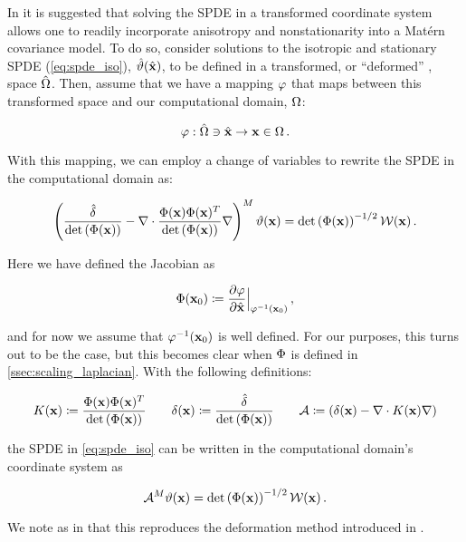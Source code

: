 In \citet{RSSB:RSSB777} it is suggested that solving the SPDE in a transformed
coordinate system allows one to readily incorporate anisotropy and
nonstationarity into a Mat\'ern covariance model.
To do so, consider solutions to the isotropic and stationary SPDE
(\cref{eq:spde_iso}), $\hat{\vartheta}(\hat{\mathbf{x}})$, to be defined in a transformed, or
``deformed'' \citep{sampson_nonparametric_1992}, space $\hat{\Omega}$.
Then, assume that we have a mapping $\varphi$ that maps between this transformed space
and our computational domain, $\Omega$:
\begin{linenomath*}\begin{equation*}
    \varphi : \hat{\Omega}\ni\hat{\mathbf{x}} \rightarrow \mathbf{x}\in\Omega \, .
\end{equation*}\end{linenomath*}
With this mapping, we can employ a change of variables
\citep{smith_change_1934} to rewrite the SPDE in the computational domain as:
\begin{linenomath*}\begin{equation*}
    \left(\dfrac{\hat{\delta}}{\text{det}\left(\Phi(\mathbf{x})\right)} -
    \nabla\cdot
    \dfrac{\Phi(\mathbf{x})\Phi(\mathbf{x})^T}{\text{det}\left(\Phi(\mathbf{x})\right)}
    \nabla\right)^M\vartheta(\mathbf{x}) =
    \text{det}\left(\Phi(\mathbf{x})\right)^{-1/2}\mathcal{W}(\mathbf{x}) \, .
\end{equation*}\end{linenomath*}
Here we have defined the Jacobian as
\begin{linenomath*}\begin{equation*}
    \Phi(\mathbf{x}_0) \coloneqq
    \dfrac{\partial \varphi}{\partial \hat{\mathbf{x}}}\Big|_{\varphi^{-1}(\mathbf{x}_{0})} \, ,
\end{equation*}\end{linenomath*}
and for now we assume that $\varphi^{-1}(\mathbf{x}_0)$ is well defined.
For our purposes, this turns out to be the case, but this becomes clear when
$\Phi$ is defined in \cref{ssec:scaling_laplacian}.
With the following definitions:
\begin{linenomath*}\begin{equation}
        K(\mathbf{x}) \coloneqq
        \dfrac{\Phi(\mathbf{x})\Phi(\mathbf{x})^T}{\text{det}\left(\Phi(\mathbf{x})\right)}
        \qquad
        \delta(\mathbf{x}) \coloneqq \dfrac{\hat{\delta}}{\text{det}\left(\Phi(\mathbf{x})\right)}
        \qquad
        \mathcal{A} \coloneqq \left(\delta(\mathbf{x}) - \nabla\cdot K(\mathbf{x})\nabla\right)
    \label{eq:matern_definitions}
\end{equation}\end{linenomath*}
the SPDE in \cref{eq:spde_iso} can be written in the computational domain's coordinate system as
\begin{linenomath*}\begin{equation}
    \mathcal{A}^M \vartheta(\mathbf{x}) =
    \text{det}\left(\Phi(\mathbf{x})\right)^{-1/2}\mathcal{W}(\mathbf{x}) \, .
    \label{eq:spde_general}
\end{equation}\end{linenomath*}
We note as in \citet{RSSB:RSSB777} that this reproduces the deformation method
introduced in \citet{sampson_nonparametric_1992}.

